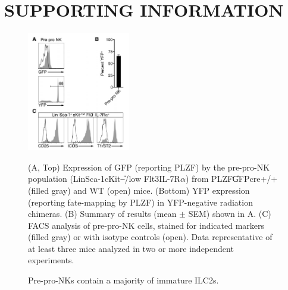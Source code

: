 \renewcommand\thefigure{\thechapter.S\arabic{figure}} 

\newpage
\section{SUPPORTING INFORMATION}
\setcounter{figure}{0}

\begin{figure}[h]
\begin{center}
	\includegraphics[width=0.4\textwidth]{figures/chapter2/S1}
\end{center}
	\caption{Pre-pro-NKs contain a majority of immature ILC2s.} 
	 (A, Top) Expression of GFP (reporting PLZF) by the pre-pro-NK population (Lin\UM Sca-1\UP cKit\U{--/low} Flt3\UM IL-7R$\alpha$\UP) from PLZF\U{GFPcre+/+} (filled gray) and WT (open) mice. (Bottom) YFP expression (reporting fate-mapping by PLZF) in YFP-negative radiation chimeras. (B) Summary of results (mean $\pm$ SEM) shown in A. (C) FACS analysis of pre-pro-NK cells, stained for indicated markers (filled gray) or with isotype controls (open). Data representative of at least three mice analyzed in two or more independent experiments.
	\label{fig:chap2_S1}
\end{figure}

